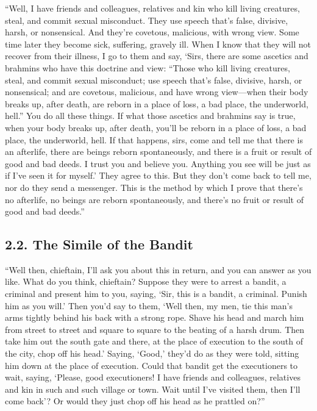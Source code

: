 \documentclass[12pt,openany]{book}%
\begin{document}
“Well, I have friends and colleagues, relatives and kin who kill living creatures, steal, and commit sexual misconduct. They use speech that’s false, divisive, harsh, or nonsensical. And they’re covetous, malicious, with wrong view. Some time later they become sick, suffering, gravely ill. When I know that they will not recover from their illness, I go to them and say, ‘Sirs, there are some ascetics and brahmins who have this doctrine and view: “Those who kill living creatures, steal, and commit sexual misconduct; use speech that’s false, divisive, harsh, or nonsensical; and are covetous, malicious, and have wrong view—when their body breaks up, after death, are reborn in a place of loss, a bad place, the underworld, hell.” You do all these things. If what those ascetics and brahmins say is true, when your body breaks up, after death, you’ll be reborn in a place of loss, a bad place, the underworld, hell. If that happens, sirs, come and tell me that there is an afterlife, there are beings reborn spontaneously, and there is a fruit or result of good and bad deeds. I trust you and believe you. Anything you see will be just as if I’ve seen it for myself.’ They agree to this. But they don’t come back to tell me, nor do they send a messenger. This is the method by which I prove that there’s no afterlife, no beings are reborn spontaneously, and there’s no fruit or result of good and bad deeds.” 

\subsection*{2.2. The Simile of the Bandit }

“Well then, chieftain, I’ll ask you about this in return, and you can answer as you like. What do you think, chieftain? Suppose they were to arrest a bandit, a criminal and present him to you, saying, ‘Sir, this is a bandit, a criminal. Punish him as you will.’ Then you’d say to them, ‘Well then, my men, tie this man’s arms tightly behind his back with a strong rope. Shave his head and march him from street to street and square to square to the beating of a harsh drum. Then take him out the south gate and there, at the place of execution to the south of the city, chop off his head.’ Saying, ‘Good,’ they’d do as they were told, sitting him down at the place of execution. Could that bandit get the executioners to wait, saying, ‘Please, good executioners! I have friends and colleagues, relatives and kin in such and such village or town. Wait until I’ve visited them, then I’ll come back’? Or would they just chop off his head as he prattled on?” 
\end{document}
